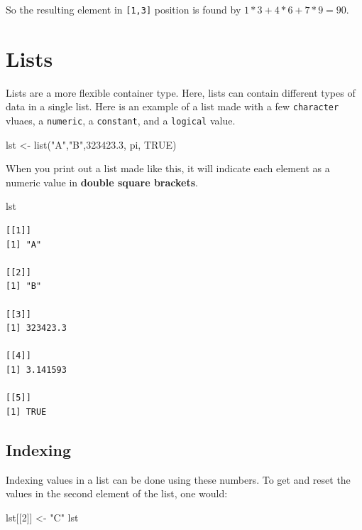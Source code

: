 \documentclass[
  letterpaper,
]{book}
\newenvironment{Shaded}{\begin{snugshade}}{\end{snugshade}}
\newcommand{\ConstantTok}[1]{\textcolor[rgb]{0.56,0.35,0.01}{#1}}
\newcommand{\DecValTok}[1]{\textcolor[rgb]{0.68,0.00,0.00}{#1}}
\newcommand{\FloatTok}[1]{\textcolor[rgb]{0.68,0.00,0.00}{#1}}
\newcommand{\FunctionTok}[1]{\textcolor[rgb]{0.28,0.35,0.67}{#1}}
\newcommand{\NormalTok}[1]{\textcolor[rgb]{0.00,0.23,0.31}{#1}}
\newcommand{\OtherTok}[1]{\textcolor[rgb]{0.00,0.23,0.31}{#1}}
\newcommand{\StringTok}[1]{\textcolor[rgb]{0.13,0.47,0.30}{#1}}
\begin{document}
So the resulting element in \texttt{{[}1,3{]}} position is found by
\(1*3 + 4*6 + 7*9 = 90\).

\section{Lists}\label{lists}

Lists are a more flexible container type. Here, lists can contain
different types of data in a single list. Here is an example of a list
made with a few \texttt{character} vluaes, a \texttt{numeric}, a
\texttt{constant}, and a \texttt{logical} value.

\begin{Shaded}
\begin{Highlighting}[]
\NormalTok{lst }\OtherTok{\textless{}{-}} \FunctionTok{list}\NormalTok{(}\StringTok{"A"}\NormalTok{,}\StringTok{"B"}\NormalTok{,}\FloatTok{323423.3}\NormalTok{, pi, }\ConstantTok{TRUE}\NormalTok{)}
\end{Highlighting}
\end{Shaded}

When you print out a list made like this, it will indicate each element
as a numeric value in \textbf{double square brackets}.

\begin{Shaded}
\begin{Highlighting}[]
\NormalTok{lst}
\end{Highlighting}
\end{Shaded}

\begin{verbatim}
[[1]]
[1] "A"

[[2]]
[1] "B"

[[3]]
[1] 323423.3

[[4]]
[1] 3.141593

[[5]]
[1] TRUE
\end{verbatim}

\subsection{Indexing}\label{indexing-1}

Indexing values in a list can be done using these numbers. To get and
reset the values in the second element of the list, one would:

\begin{Shaded}
\begin{Highlighting}[]
\NormalTok{lst[[}\DecValTok{2}\NormalTok{]] }\OtherTok{\textless{}{-}} \StringTok{"C"}
\NormalTok{lst}
\end{Highlighting}
\end{Shaded}
\end{document}
